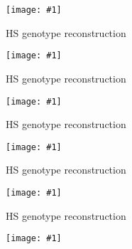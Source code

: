 \documentclass[12pt]{article}
\newcommand{\headsize}{\fontsize{35}{35} \selectfont}
\newcommand{\figh}[2]{\centerline{\texttt{[image: \#1]}}}
\begin{document}
\vspace{5mm}

\figh{Figs/genoprobsA.pdf}{0.9}


\newpage

\headsize \color{myyellow}
\hfill\begin{minipage}{6.75in}
\centering
HS genotype reconstruction
\end{minipage}

\vspace{5mm}

\figh{Figs/genoprobsB.pdf}{0.9}


\newpage

\headsize \color{myyellow}
\hfill\begin{minipage}{6.75in}
\centering
HS genotype reconstruction
\end{minipage}

\vspace{5mm}

\figh{Figs/genoprobsC.pdf}{0.9}


\newpage

\headsize \color{myyellow}
\hfill\begin{minipage}{6.75in}
\centering
HS genotype reconstruction
\end{minipage}

\vspace{5mm}

\figh{Figs/genoprobsD.pdf}{0.9}


\newpage

\headsize \color{myyellow}
\hfill\begin{minipage}{6.75in}
\centering
HS genotype reconstruction
\end{minipage}

\vspace{5mm}

\figh{Figs/genoprobsE.pdf}{0.9}


\newpage

\headsize \color{myyellow}
\hfill\begin{minipage}{6.75in}
\centering
HS genotype reconstruction
\end{minipage}

\vspace{5mm}

\figh{Figs/genoprobsF.pdf}{0.9}
\end{document}
